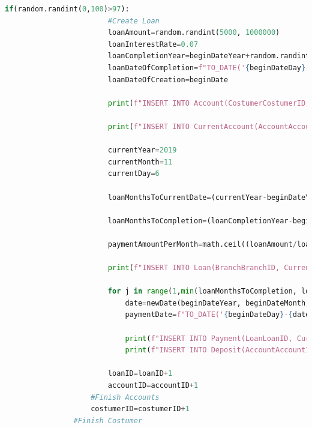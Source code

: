 \documentclass[a4paper, 10pt]{article}
\begin{document}
\begin{lstlisting}[language=python]
                    if(random.randint(0,100)>97):
                        #Create Loan
                        loanAmount=random.randint(5000, 1000000)
                        loanInterestRate=0.07
                        loanCompletionYear=beginDateYear+random.randint(1,2)
                        loanDateOfCompletion=f"TO_DATE('{beginDateDay}-{beginDateMonth}-{loanCompletionYear}','DD-MM-YYYY')"
                        loanDateOfCreation=beginDate

                        print(f"INSERT INTO Account(CostumerCostumerID, BranchBranchID, Amount, BeginDate, EndDate) VALUES ({costumerID}, {branchID}, {loanAmount}, {beginDate}, {endDate});")

                        print(f"INSERT INTO CurrentAccount(AccountAccountID, MaximumWithdraw) VALUES ({accountID}, {maximumWithdraw});")

                        currentYear=2019
                        currentMonth=11
                        currentDay=6

                        loanMonthsToCurrentDate=(currentYear-beginDateYear)*12+(currentMonth-beginDateMonth)+(-1 if currentDay < beginDateDay else (0))

                        loanMonthsToCompletion=(loanCompletionYear-beginDateYear)*12

                        paymentAmountPerMonth=math.ceil((loanAmount/loanMonthsToCompletion)*1+loanInterestRate)

                        print(f"INSERT INTO Loan(BranchBranchID, CurrentAccountAccountAccountID, Amount, InterestRate, DateOfCreation, DateOfCompletion) VALUES ({branchID}, {accountID}, {loanAmount}, {loanInterestRate}, {loanDateOfCreation}, {loanDateOfCompletion});")
                        
                        for j in range(1,min(loanMonthsToCompletion, loanMonthsToCurrentDate)+1):
                            date=newDate(beginDateYear, beginDateMonth, j)
                            paymentDate=f"TO_DATE('{beginDateDay}-{date[1]}-{date[0]}','DD-MM-YYYY')"

                            print(f"INSERT INTO Payment(LoanLoanID, CurrentAccountAccountID, PaymentDate, Amount) VALUES ({loanID}, {accountID}, {paymentDate}, {paymentAmountPerMonth});")
                            print(f"INSERT INTO Deposit(AccountAccountID, DepositDate, Amount) VALUES ({accountID}, {paymentDate},{paymentAmountPerMonth});")
                        
                        loanID=loanID+1
                        accountID=accountID+1
                    #Finish Accounts
                    costumerID=costumerID+1
                #Finish Costumer
\end{lstlisting}
\end{document}
